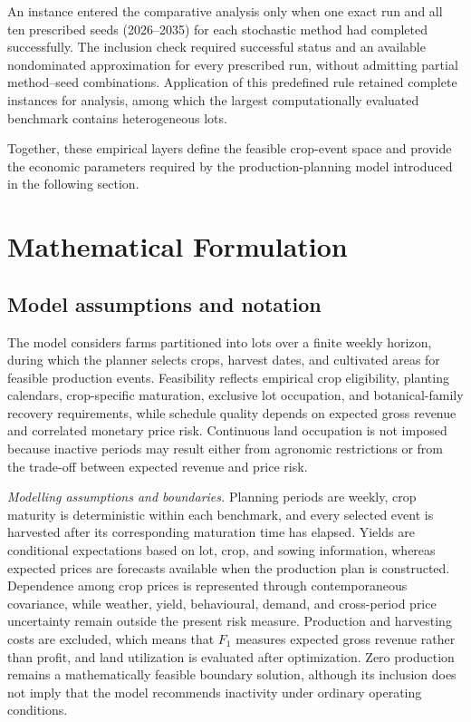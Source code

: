 \documentclass[]{interact}
\begin{document}
An instance entered the comparative analysis only when one exact run and all ten prescribed seeds (2026--2035) for each stochastic method had completed successfully. The inclusion check required successful status and an available nondominated approximation for every prescribed run, without admitting partial method--seed combinations. Application of this predefined rule retained \NIncludedInstances{} complete instances for analysis, among which the largest computationally evaluated benchmark contains \LargestIncludedLots{} heterogeneous lots.



Together, these empirical layers define the feasible crop-event space and provide the economic parameters required by the production-planning model introduced in the following section.

\section{Mathematical Formulation}

\subsection{Model assumptions and notation}

The model considers farms partitioned into lots over a finite weekly horizon, during which the planner selects crops, harvest dates, and cultivated areas for feasible production events. Feasibility reflects empirical crop eligibility, planting calendars, crop-specific maturation, exclusive lot occupation, and botanical-family recovery requirements, while schedule quality depends on expected gross revenue and correlated monetary price risk. Continuous land occupation is not imposed because inactive periods may result either from agronomic restrictions or from the trade-off between expected revenue and price risk.

\noindent\textit{Modelling assumptions and boundaries.}
Planning periods are weekly, crop maturity is deterministic within each benchmark, and every selected event is harvested after its corresponding maturation time has elapsed. Yields are conditional expectations based on lot, crop, and sowing information, whereas expected prices are forecasts available when the production plan is constructed. Dependence among crop prices is represented through contemporaneous covariance, while weather, yield, behavioural, demand, and cross-period price uncertainty remain outside the present risk measure. Production and harvesting costs are excluded, which means that $F_1$ measures expected gross revenue rather than profit, and land utilization is evaluated after optimization. Zero production remains a mathematically feasible boundary solution, although its inclusion does not imply that the model recommends inactivity under ordinary operating conditions.
\end{document}

